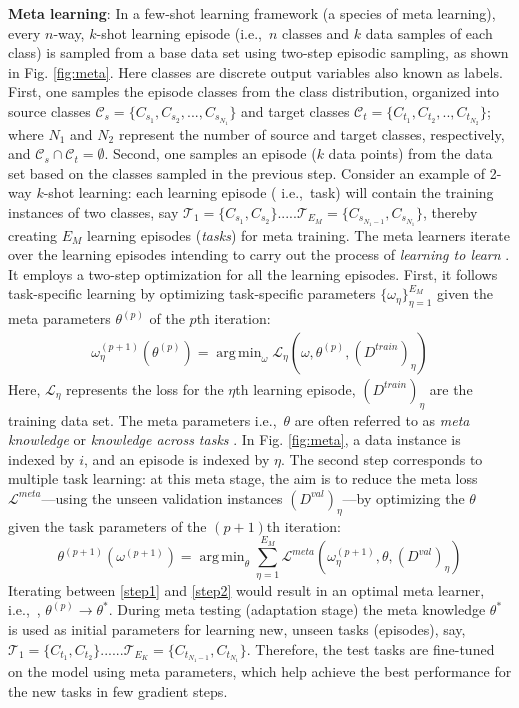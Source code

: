 \documentclass[conference]{IEEEtran}
\DeclareMathOperator*{\argmin}{arg\,min}
\newcommand*{\ie}		{i.e.,\ }
\begin{document}
 \textbf{Meta learning}:
In a few-shot learning framework (a species of meta learning), every $n$-way, $k$-shot learning episode (\ie $n$ classes and $k$ data samples of each class) is sampled from a base data set using two-step episodic sampling, as shown in Fig. \ref{fig:meta}.
Here classes are discrete output variables also known as labels.
First, one samples the episode classes from the class distribution, organized into source classes $\mathcal{C}_s=\{C_{s_1}, C_{s_2},...,C_{s_{N_1}}\}$ and target classes $\mathcal{C}_t=\{C_{t_1}, C_{t_2},.., C_{t_{N_2}}\}$; where $N_1$ and $N_2$ represent the number of source and target classes, respectively, and $\mathcal{C}_s \cap \mathcal{C}_t=\emptyset$.
Second, one samples an episode ($k$ data points) from the data set based on the classes sampled in the previous step. 
Consider an example of 2-way $k$-shot learning: each learning episode ( \ie task) will contain the training instances of two classes, say $ \mathcal{T}_1=\{C_{s_1}, C_{s_2}\} ..... \mathcal{T}_{E_M}=\{C_{s_{N_1-1}}, C_{s_{N_1}}\}$, thereby creating $E_M$ learning episodes (\emph{tasks}) for meta training.
The meta learners iterate over the learning episodes intending to carry out the process of \emph{learning to learn} \cite{hospedales2020meta}. 
It employs a two-step optimization \cite{pmlr-v70-finn17a} for all the learning episodes. 
First, it follows task-specific learning by optimizing task-specific parameters $\{\omega_\eta\}_{\eta=1}^{E_M}$ given the meta parameters $\theta^{(p)}$ of the $p$th iteration:
\begin{align}\label{step1}
    \omega^{(p+1)}_{\eta}(\theta^{(p)})  = \argmin_{\omega} \mathcal{L}_{\eta}(\omega, \theta^{(p)}, (D^{train})_{\eta})
\end{align}
Here, $\mathcal{L}_{\eta}$ represents the loss for the $\eta$th learning episode, $(D^{train})_{\eta}$ are the training data set. The meta parameters \ie $\theta$ are often referred to as \emph{meta knowledge} or \emph{knowledge across tasks} \cite{hospedales2020meta}.
In Fig. \ref{fig:meta}, a data instance is indexed by $i$, and an episode is indexed by $\eta$. 
The second step corresponds to multiple task learning: at this meta stage, the aim is to reduce the meta loss $\mathcal{L}^{meta}$---using the unseen validation instances $(D^{val})_{\eta}$---by optimizing the $\theta$ given the task parameters of the $(p+1)$th iteration:
\begin{equation}\label{step2}
    \theta^{(p+1)}(\omega^{(p+1)}) = \argmin_\theta \sum_{\eta = 1}^{E_M} \mathcal{L}^{meta}(\omega^{(p+1)}_{\eta}, \theta, (D^{val})_{\eta})
\end{equation}
Iterating between \eqref{step1} and \eqref{step2} would result in an optimal meta learner, \ie, $\theta^{(p)}\to\theta^\ast$.
During meta testing (adaptation  stage) the meta knowledge $\theta^*$ is used as initial parameters for learning new, unseen tasks (episodes), say, $\mathcal{T}_1=\{C_{t_1}, C_{t_2}\}......\mathcal{T}_{E_K}=\{C_{t_{N_1-1}}, C_{t_{N_1}}\}$. 
Therefore, the test tasks are fine-tuned on the model using meta parameters, which help achieve the best performance for the new tasks in few gradient steps.  
\end{document}
